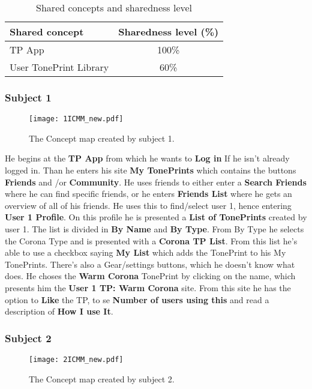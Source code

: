 \begin{table}[H]
	\centering
	\begin{tabular}[width=\textwidth]{|l|c|}
	\hline
	Shared concept & Sharedness level (\%) \\ \hline
	TP App & 100\% \\ 
	User TonePrint Library & 60\% \\ \hline
	\end{tabular}
	\caption{Shared concepts and sharedness level}
	\label{tab:SharedConcept}
\end{table}


\subsubsection{Subject 1}
\label{Subject1ICMM}
\begin{figure}[H]
	\centering
	\texttt{[image: 1ICMM\_new.pdf]}
	\caption{The Concept map created by subject 1.}
	\label{fig:ICMM1}
\end{figure}

He begins at the \textbf{TP App} from which he wants to \textbf{Log in} If he isn’t already logged in. Than he enters his site \textbf{My TonePrints} which contains the buttons \textbf{Friends} and /or \textbf{Community}. He uses friends to either enter a \textbf{Search Friends} where he can find specific friends, or he enters \textbf{Friends List} where he gets an overview of all of his friends. He uses this to find/select user 1, hence entering \textbf{User 1 Profile}. On this profile he is presented a \textbf{List of TonePrints} created by user 1. The list is divided in \textbf{By Name} and \textbf{By Type}. From By Type he selects the Corona Type and is presented with a \textbf{Corona TP List}. From this list he’s able to use a checkbox saying \textbf{My List} which adds the TonePrint to his My TonePrints. There’s also a Gear/settings buttons, which he doesn’t know what does. He choses the \textbf{Warm Corona} TonePrint by clicking on the name, which presents him the \textbf{User 1 TP: Warm Corona} site. From this site he has the option to \textbf{Like} the TP, to se \textbf{Number of users using this} and read a description of \textbf{How I use It}.


\subsubsection{Subject 2}
\label{Subject2ICMM}
\begin{figure}[H]
	\centering
	\texttt{[image: 2ICMM\_new.pdf]}
	\caption{The Concept map created by subject 2.}
	\label{fig:ICMM2}
\end{figure}

